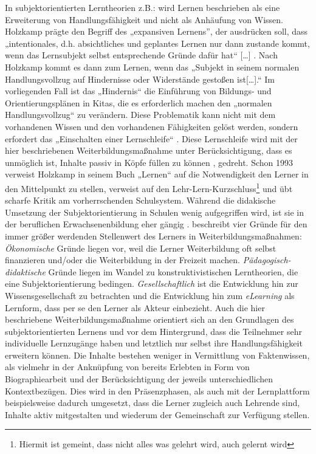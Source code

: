 \documentclass[12pt, bibliography=totoc]{scrartcl}
\begin{document}
In subjektorientierten Lerntheorien z.B.: \parencite{Holzkamp2004} wird
Lernen beschrieben als eine Erweiterung von Handlungsfähigkeit und nicht
als Anhäufung von Wissen. Holzkamp prägte den Begriff des „expansiven
Lernens'', der ausdrücken soll, dass „intentionales, d.h. absichtliches
und geplantes Lernen nur dann zustande kommt, wenn das Lernsubjekt
selbst entsprechende Gründe dafür hat`` {[}\ldots{]}
\parencite[29]{Holzkamp2004}. Nach Holzkamp kommt es dann zum Lernen,
wenn das „Subjekt in seinem normalen Handlungsvollzug auf Hindernisse
oder Widerstände gestoßen ist{[}\ldots{]}.`` Im vorliegenden Fall ist
das „Hindernis`` die Einführung von Bildungs- und Orientierungsplänen in
Kitas, die es erforderlich machen den „normalen Handlungsvollzug`` zu
verändern. Diese Problematik kann nicht mit dem vorhandenen Wissen und
den vorhandenen Fähigkeiten gelöst werden, sondern erfordert das
„Einschalten einer Lernschleife`` \parencite[29]{Holzkamp2004}. Diese
Lernschleife wird mit der hier beschriebenen Weiterbildungsmaßnahme
unter Berücksichtigung, dass es unmöglich ist, Inhalte passiv in Köpfe
füllen zu können \parencite[12]{Faulstich2012}, gedreht. Schon 1993
verweist Holzkamp in seinem Buch „Lernen`` auf die Notwendigkeit den
Lerner in den Mittelpunkt zu stellen, verweist auf den
Lehr-Lern-Kurzschluss\footnote{Hiermit ist gemeint, dass nicht alles was gelehrt wird, auch gelernt wird}
und übt scharfe Kritik am vorherrschenden Schulsystem. Während die
didakische Umsetzung der Subjektorientierung in Schulen wenig
aufgegriffen wird, ist sie in der beruflichen Erwachsenenbildung eher
gängig \parencite{grotluschen2005expansives}.
\textcite[138]{ehlers2011qualitat} beschreibt vier Gründe für den immer
größer werdenden Stellenwert des Lerners in Weiterbildungsmaßnahmen:
\emph{Ökonomische} Gründe liegen vor, weil die Lerner Weiterbildung oft
selbst finanzieren und/oder die Weiterbildung in der Freizeit machen.
\emph{Pädagogisch-didaktische} Gründe liegen im Wandel zu
konstruktivistischen Lerntheorien, die eine Subjektorientierung
bedingen. \emph{Gesellschaftlich} ist die Entwicklung hin zur
Wissensgesellschaft zu betrachten und die Entwicklung hin zum
\emph{eLearning} als Lernform, dass per se den Lerner als Akteur
einbezieht. Auch die hier beschriebene Weiterbildungsmaßnahme orientiert
sich an den Grundlagen des subjektorientierten Lernens und vor dem
Hintergrund, dass die Teilnehmer sehr individuelle Lernzugänge haben und
letztlich nur selbst ihre Handlungsfähigkeit erweitern können. Die
Inhalte bestehen weniger in Vermittlung von Faktenwissen, als vielmehr
in der Anknüpfung von bereits Erlebten in Form von Biographiearbeit und
der Berücksichtigung der jeweils unterschiedlichen Kontextbezügen. Dies
wird in den Präsenzphasen, als auch mit der Lernplattform beispielsweise
dadurch umgesetzt, dass die Lerner zugleich auch Lehrende sind, Inhalte
aktiv mitgestalten und wiederum der Gemeinschaft zur Verfügung stellen.
\end{document}
